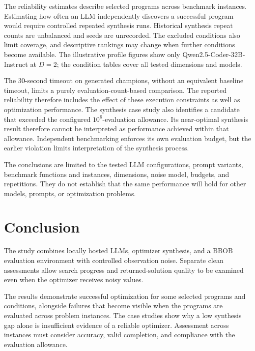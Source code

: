 The reliability estimates describe selected programs across benchmark
instances. Estimating how often an LLM independently discovers a successful
program would require controlled repeated synthesis runs. Historical synthesis
repeat counts are unbalanced and seeds are unrecorded. The excluded
conditions also limit coverage, and descriptive rankings may change
when further conditions become available. The illustrative profile figures show only
Qwen2.5-Coder-32B-Instruct at $D=2$; the condition tables cover all tested dimensions and models.

The 30-second timeout on generated champions, without an equivalent
baseline timeout, limits a purely evaluation-count-based comparison.
The reported reliability therefore includes the effect of these
execution constraints as well as optimization performance.
The synthesis case study also identifies a candidate that exceeded the
configured $10^6$-evaluation allowance. Its near-optimal synthesis result
therefore cannot be interpreted as performance achieved within that
allowance. Independent benchmarking enforces its own evaluation budget,
but the earlier violation limits interpretation of the synthesis process.

The conclusions are limited to the tested LLM configurations, prompt
variants, benchmark functions and instances, dimensions, noise model,
budgets, and repetitions. They do not establish that the same performance
will hold for other models, prompts, or optimization problems.

\section{Conclusion}
\label{sec:discussion_conclusion}

The study combines locally hosted LLMs, optimizer synthesis, and a
BBOB evaluation environment with controlled observation noise. Separate
clean assessments allow search progress and returned-solution quality
to be examined even when the optimizer receives noisy values.

The results demonstrate successful optimization for some selected
programs and conditions, alongside failures that become visible when
the programs are evaluated across problem instances. The case studies
show why a low synthesis gap alone is insufficient evidence of a
reliable optimizer. Assessment across instances must consider accuracy,
valid completion, and compliance with the evaluation allowance.


